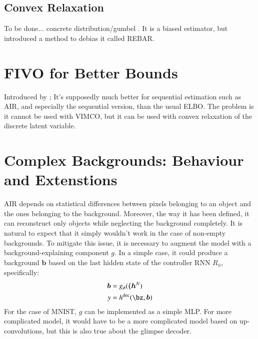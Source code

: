 \documentclass[]{article}
\begin{document}
    \subsection{Convex Relaxation}
        To be done... concrete distribution/gumbel \cite{Maddison2016,Jang2016}. It is a biased estimator, but \cite{Tucker2017} introduced a method to debias it called REBAR. 
        
\section{FIVO for Better Bounds}
    Introduced by \cite{Maddison2017}; It's supposedly much better for sequential estimation such as AIR, and especially the sequential version, than the usual ELBO. The problem is it cannot be used with VIMCO, but it can be used with convex relaxation of the discrete latent variable.
        
\section{Complex Backgrounds: Behaviour and Extenstions}

    AIR depends on statistical differences between pixels belonging to an object and the ones belonging to the background. Moreover, the way it has been defined, it can reconstruct only objects while neglecting the background completely. It is natural to expect that it simply wouldn't work in the case of non-empty backgrounds. To mitigate this issue, it is necessary to augment the model with a background-explaining component $g$. In a simple case, it could produce a background $\bm{b}$ based on the last hidden state of the controller RNN $R_\phi$, specifically:
    \begin{align}
        \bm{b} &= g_\phi( \bm{(h}^N )\\
        y &= h^{\mathrm{dec}}( \bz, \bm{b})
    \end{align}
    For the case of MNIST, $g$ can be implemented as a simple MLP. For more complicated model, it would have to be a more complicated model based on up-convolutions, but this is also true about the glimpse decoder.
    

    
	\printbibliography
\end{document}
